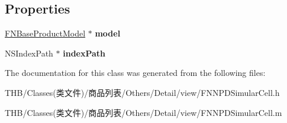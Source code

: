 \subsection*{Properties}
\begin{DoxyCompactItemize}
\item 
\mbox{\label{interface_f_n_n_p_d_simular_cell_a6c3c52e1acfc25b0e7bfd570b6080fb4}} 
\mbox{\hyperlink{interface_f_n_base_product_model}{F\+N\+Base\+Product\+Model}} $\ast$ {\bfseries model}
\item 
\mbox{\label{interface_f_n_n_p_d_simular_cell_ab7aed8b422627951f190090525fbe4fe}} 
N\+S\+Index\+Path $\ast$ {\bfseries index\+Path}
\end{DoxyCompactItemize}


The documentation for this class was generated from the following files\+:\begin{DoxyCompactItemize}
\item 
T\+H\+B/\+Classes(类文件)/商品列表/\+Others/\+Detail/view/F\+N\+N\+P\+D\+Simular\+Cell.\+h\item 
T\+H\+B/\+Classes(类文件)/商品列表/\+Others/\+Detail/view/F\+N\+N\+P\+D\+Simular\+Cell.\+m\end{DoxyCompactItemize}
